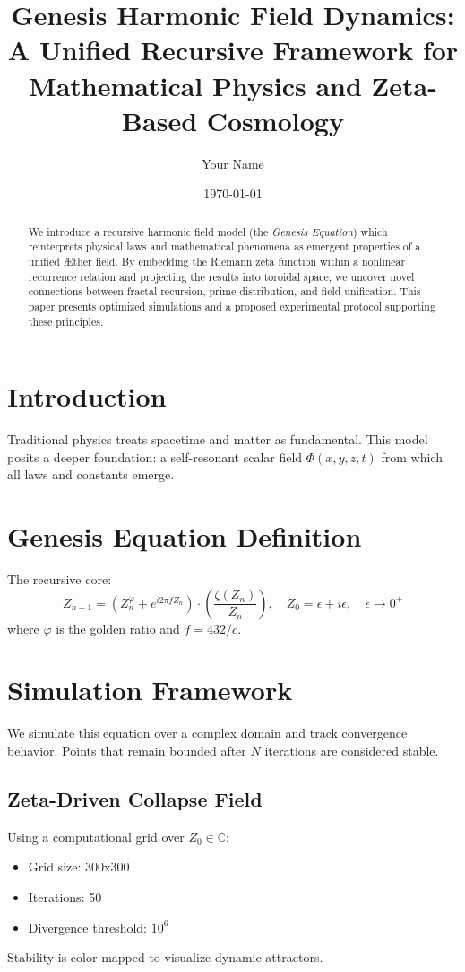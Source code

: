 \documentclass[12pt]{article}
\title{\textbf{Genesis Harmonic Field Dynamics: A Unified Recursive Framework for Mathematical Physics and Zeta-Based Cosmology}}
\author[1]{Your Name}
\affil[1]{PulsR AI Research Division}
\date{\today}
\begin{document}
\maketitle

\begin{abstract}
We introduce a recursive harmonic field model (the \textit{Genesis Equation}) which reinterprets physical laws and mathematical phenomena as emergent properties of a unified Æther field. By embedding the Riemann zeta function within a nonlinear recurrence relation and projecting the results into toroidal space, we uncover novel connections between fractal recursion, prime distribution, and field unification. This paper presents optimized simulations and a proposed experimental protocol supporting these principles.
\end{abstract}

\section{Introduction}
Traditional physics treats spacetime and matter as fundamental. This model posits a deeper foundation: a self-resonant scalar field $\Phi(x, y, z, t)$ from which all laws and constants emerge.

\section{Genesis Equation Definition}
The recursive core:
\[
Z_{n+1} = \left( Z_n^\varphi + e^{i2\pi f Z_n} \right) \cdot \left( \frac{\zeta(Z_n)}{Z_n} \right), \quad Z_0 = \epsilon + i\epsilon, \quad \epsilon \to 0^+
\]
where $\varphi$ is the golden ratio and $f = 432/c$.

\section{Simulation Framework}
We simulate this equation over a complex domain and track convergence behavior. Points that remain bounded after $N$ iterations are considered stable.

\subsection{Zeta-Driven Collapse Field}
Using a computational grid over $Z_0 \in \mathbb{C}$:
\begin{itemize}
    \item Grid size: 300x300
    \item Iterations: 50
    \item Divergence threshold: $10^6$
\end{itemize}
Stability is color-mapped to visualize dynamic attractors.
\end{document}

